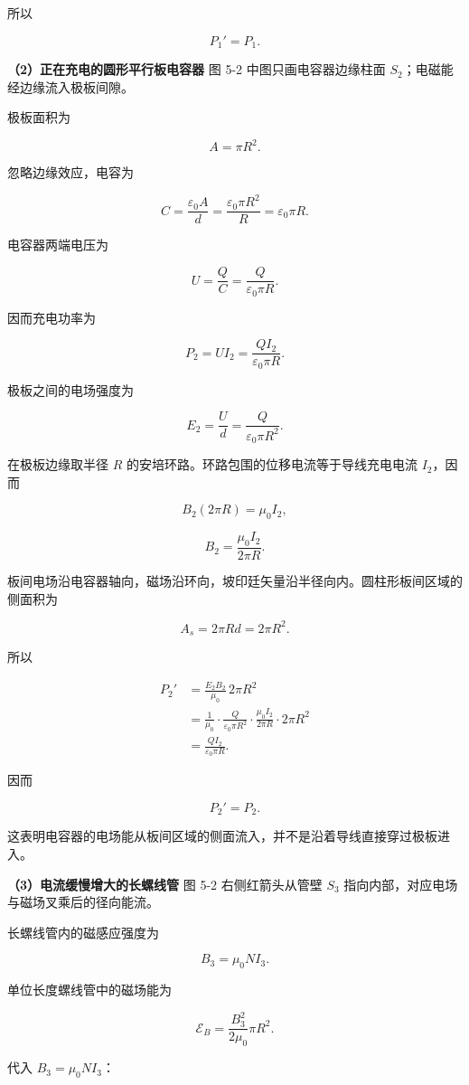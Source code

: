 \documentclass[12pt,a4paper,UTF8]{ctexart}
\begin{document}
所以

\[\boxed{P_1'=P_1}.\]

\textbf{（2）正在充电的圆形平行板电容器} 图 5-2 中图只画电容器边缘柱面
\(S_2\)；电磁能经边缘流入极板间隙。

极板面积为

\[A=\pi R^2.\]

忽略边缘效应，电容为

\[C=\frac{\varepsilon_0A}{d}
=\frac{\varepsilon_0\pi R^2}{R}
=\varepsilon_0\pi R.\]

电容器两端电压为

\[U=\frac QC=\frac{Q}{\varepsilon_0\pi R}.\]

因而充电功率为

\[\boxed{P_2=UI_2=\frac{QI_2}{\varepsilon_0\pi R}}.\]

极板之间的电场强度为

\[E_2=\frac U d
=\frac{Q}{\varepsilon_0\pi R^2}.\]

在极板边缘取半径 \(R\) 的安培环路。环路包围的位移电流等于导线充电电流
\(I_2\)，因而

\[B_2(2\pi R)=\mu_0I_2,\]

\[\boxed{B_2=\frac{\mu_0I_2}{2\pi R}}.\]

板间电场沿电容器轴向，磁场沿环向，坡印廷矢量沿半径向内。圆柱形板间区域的侧面积为

\[A_s=2\pi Rd=2\pi R^2.\]

所以

\[\begin{aligned}
P_2'
&=\frac{E_2B_2}{\mu_0}\,2\pi R^2\\
&=\frac1{\mu_0}
\cdot\frac{Q}{\varepsilon_0\pi R^2}
\cdot\frac{\mu_0I_2}{2\pi R}
\cdot2\pi R^2\\
&=\frac{QI_2}{\varepsilon_0\pi R}.
\end{aligned}\]

因而

\[\boxed{P_2'=P_2}.\]

这表明电容器的电场能从板间区域的侧面流入，并不是沿着导线直接穿过极板进入。

\textbf{（3）电流缓慢增大的长螺线管} 图 5-2 右侧红箭头从管壁 \(S_3\)
指向内部，对应电场与磁场叉乘后的径向能流。

长螺线管内的磁感应强度为

\[\boxed{B_3=\mu_0NI_3}.\]

单位长度螺线管中的磁场能为

\[\mathcal E_B
=\frac{B_3^2}{2\mu_0}\pi R^2.\]

代入 \(B_3=\mu_0NI_3\)：
\end{document}
